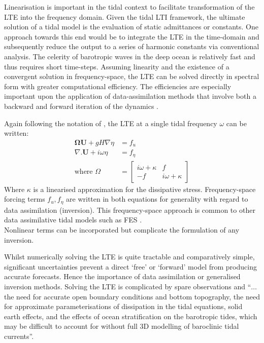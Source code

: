 Linearisation is important in the tidal context to facilitate transformation of the LTE into the frequency domain.   Given the tidal LTI framework, the ultimate solution of a tidal model is the evaluation of static admittances or constants.   One approach towards this end would be to integrate the LTE in the time-domain and subsequently reduce the output to a series of harmonic constants via conventional analysis.   The celerity of barotropic waves in the deep ocean is relatively fast and thus requires short time-steps.   Assuming linearity and the existence of a convergent solution in frequency-space, the LTE can be solved directly in spectral form with greater computational efficiency.   The efficiencies are especially important upon the application of data-assimilation methods that involve both a backward and forward iteration of the dynamics \cite[pp184]{Egbert:2002ug}.


Again following the notation of \cite[pp186]{Egbert:2002ug}, the LTE at a single tidal frequency $\omega$ can be written:
\begin{align}
\label{E:LTE_momtm_w}
\mathbf{\Omega} \mathbf{U} + gH\nabla \eta &= f_u \\
\label{E:LTE_cont_w}
\nabla.\mathbf{U} + i\omega\eta &= f_\eta\\
\mbox{where   } \Omega             &=
\left[ \begin{array}{cc} 
      i\omega + \kappa & f \\ 
       -f              & i\omega + \kappa  
                        \end{array} \right]   \nonumber
\end{align}
Where $\kappa$ is a linearised approximation for the dissipative stress.   Frequency-space forcing terms $f_u, f_\eta$ are written in both equations for generality with regard to data assimilation (inversion).  This frequency-space approach is common to other data assimilative tidal models such as FES \cite[pp395]{Lyard:2006ir}.\\
Nonlinear terms can be incorporated but complicate the formulation of any inversion.


Whilst numerically solving the LTE is quite tractable and comparatively simple, significant uncertainties prevent a direct `free' or `forward' model from producing accurate forecasts.  Hence the importance of data assimilation or generalised inversion methods.  Solving the LTE is complicated by spare observations and ``$\dots$ the need for accurate open boundary conditions and bottom topography, the need for approximate parameterisations of dissipation in the tidal equations, solid earth effects, and the effects of ocean stratification on the barotropic tides, which may be difficult to account for without full 3D modelling of baroclinic tidal currents''\citep[183]{Egbert:2002ug}.

